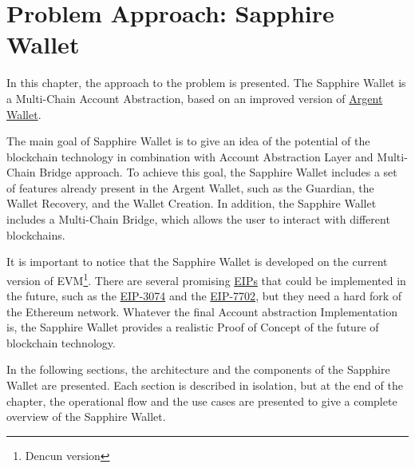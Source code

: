 \chapter{Problem Approach: Sapphire Wallet}
\label{chap:problem_approach}

In this chapter, the approach to the problem is presented. The Sapphire Wallet is a Multi-Chain Account Abstraction, based on an improved version of \hyperref[subsec:argent]{Argent Wallet}.

The main goal of Sapphire Wallet is to give an idea of the potential of the blockchain technology in combination with Account Abstraction Layer and Multi-Chain Bridge approach. To achieve this goal, the Sapphire Wallet includes a set of features already present in the Argent Wallet, such as the Guardian, the Wallet Recovery, and the Wallet Creation. In addition, the Sapphire Wallet includes a Multi-Chain Bridge, which allows the user to interact with different blockchains. 

It is important to notice that the Sapphire Wallet is developed on the current version of EVM\footnote{Dencun version}. There are several promising \hyperref[subsec:eips]{EIPs} that could be implemented in the future, such as the \hyperref[subsubsec:eip-3074]{EIP-3074} and the \hyperref[subsubsec:erc-7702]{EIP-7702}, but they need a hard fork of the Ethereum network. Whatever the final Account abstraction Implementation is, the Sapphire Wallet provides a realistic Proof of Concept of the future of blockchain technology.  

In the following sections, the architecture and the components of the Sapphire Wallet are presented. Each section is described in isolation, but at the end of the chapter, the operational flow and the use cases are presented to give a complete overview of the Sapphire Wallet.








